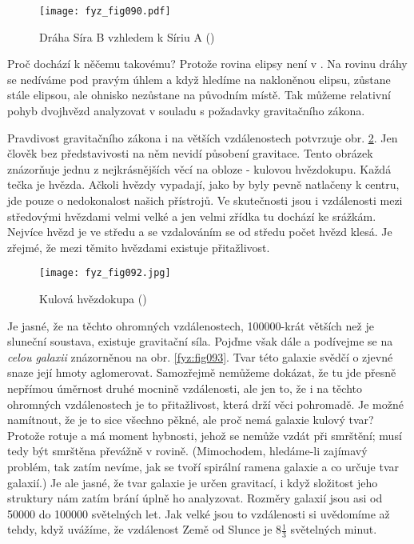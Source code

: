     \begin{figure}[ht!]  %
      \centering
      \texttt{[image: fyz\_fig090.pdf]}
      \caption{Dráha Síra B vzhledem k Síriu A (\cite[s.~99]{Feynman01})}
      \label{fyz:fig090}
    \end{figure}
    
    Proč dochází k něčemu takovému? Protože rovina elipsy není v . Na rovinu 
    dráhy se nedíváme pod pravým úhlem a když hledíme na nakloněnou elipsu, zůstane stále elipsou, 
    ale ohnisko nezůstane na původním místě. Tak můžeme relativní pohyb dvojhvězd analyzovat v 
    souladu s požadavky gravitačního zákona. 
    
    Pravdivost gravitačního zákona i na větších vzdálenostech potvrzuje obr. \ref{fyz:fig092}. Jen 
    člověk bez představivosti na něm nevidí působení gravitace. Tento obrázek znázorňuje jednu z 
    nejkrásnějších věcí na obloze - kulovou hvězdokupu. Každá tečka je hvězda. Ačkoli hvězdy 
    vypadají, jako by byly pevně natlačeny k centru, jde pouze o nedokonalost našich přístrojů. Ve 
    skutečnosti jsou i vzdálenosti mezi středovými hvězdami velmi velké a jen velmi zřídka tu 
    dochází ke srážkám. Nejvíce hvězd je ve středu a se vzdalováním se od středu počet hvězd klesá. 
    Je zřejmé, že mezi těmito hvězdami existuje přitažlivost. 
    
    \begin{figure}[ht!]  %
      \centering
      \texttt{[image: fyz\_fig092.jpg]}
      \caption{Kulová hvězdokupa (\cite[s.~100]{Feynman01})}
      \label{fyz:fig092}
    \end{figure}
    Je jasné, že na těchto ohromných vzdálenostech, \num{100000}-krát větších než je sluneční 
    soustava, existuje gravitační síla. Pojďme však dále a podívejme se na \emph{celou galaxii} 
    znázorněnou na obr. \ref{fyz:fig093}. Tvar této galaxie svědčí o zjevné snaze její hmoty 
    aglomerovat. Samozřejmě nemůžeme dokázat, že tu jde přesně nepřímou úměrnost druhé mocnině 
    vzdálenosti, ale jen to, že i na těchto ohromných vzdálenostech je to přitažlivost, která drží 
    věci pohromadě. Je možné namítnout, že je to sice všechno pěkné, ale proč nemá galaxie kulový 
    tvar? Protože rotuje a má moment hybnosti, jehož se nemůže vzdát při smrštění; musí tedy být 
    smrštěna převážně v rovině. (Mimochodem, hledáme-li zajímavý problém, tak zatím nevíme, jak se 
    tvoří spirální ramena galaxie a co určuje tvar galaxií.) Je ale jasné, že tvar galaxie je určen 
    gravitací, i když složitost jeho struktury nám zatím brání úplně ho analyzovat. Rozměry galaxií 
    jsou asi od \num{50000} do \num{100000} světelných let. Jak velké jsou to vzdálenosti si 
    uvědomíme až tehdy, když uvážíme, že vzdálenost Země od Slunce je  \(8\tfrac{1}{3}\) světelných 
    minut. 
    
